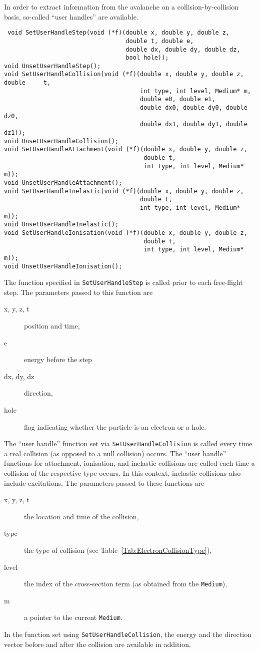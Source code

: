In order to extract information from the avalanche on a collision-by-collision basis, 
so-called ``user handles'' are available. 
\begin{lstlisting}
 void SetUserHandleStep(void (*f)(double x, double y, double z,
                                  double t, double e,
                                  double dx, double dy, double dz,
                                  bool hole));
void UnsetUserHandleStep();
void SetUserHandleCollision(void (*f)(double x, double y, double z, double     t,
                                      int type, int level, Medium* m,
                                      double e0, double e1,
                                      double dx0, double dy0, double dz0,
                                      double dx1, double dy1, double dz1));
void UnsetUserHandleCollision();
void SetUserHandleAttachment(void (*f)(double x, double y, double z,
                                       double t,
                                       int type, int level, Medium* m));
void UnsetUserHandleAttachment();
void SetUserHandleInelastic(void (*f)(double x, double y, double z,
                                      double t,
                                      int type, int level, Medium* m));
void UnsetUserHandleInelastic();
void SetUserHandleIonisation(void (*f)(double x, double y, double z,
                                       double t,
                                       int type, int level, Medium* m));
void UnsetUserHandleIonisation();
\end{lstlisting}
The function specified in \texttt{SetUserHandleStep} is called 
prior to each free-flight step. 
The parameters passed to this function are 
\begin{description}
  \item[x, y, z, t] 
  position and time, 
  \item[e]
  energy before the step
  \item[dx, dy, dz] 
  direction,
  \item[hole]
  flag indicating whether the particle is an electron or a hole.
\end{description}  
The ``user handle'' function set via \texttt{SetUserHandleCollision} 
is called every time a real collision (as opposed to a null collision) occurs.
The ``user handle'' functions for attachment, ionisation, and inelastic collisions 
are called each time a collision of the respective type occurs.  
In this context, inelastic collisions also include excitations. 
The parameters passed to these functions are 
\begin{description}
  \item[x, y, z, t]
  the location and time of the collision, 
  \item[type]
  the type of collision (see Table~\ref{Tab:ElectronCollisionType}), 
  \item[level]
  the index of the cross-section term (as obtained from the \texttt{Medium}),
  \item[m]
   a pointer to the current \texttt{Medium}. 
\end{description}
In the function set using \texttt{SetUserHandleCollision}, the energy 
and the direction vector before and after the collision are available 
in addition. 

